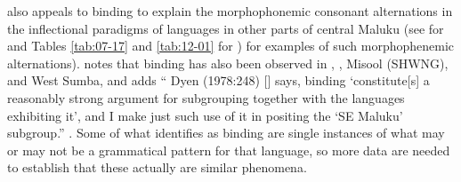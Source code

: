 
\citet[252]{Mills1991} also appeals to binding to explain the
morphophonemic consonant alternations in the inflectional paradigms
of languages in other parts of central Maluku (see 
for  and Tables \ref{tab:07-17} and \ref{tab:12-01} for )
for examples of such morphophenemic alternations).
\citet[252f]{Mills1991} notes that binding has also been observed
in , , Misool (SHWNG), and West Sumba, and adds “ 
Dyen (1978:248) [\citealp{Dyen1978a}]
says, binding ‘constitute[s] a reasonably strong argument for subgrouping
together with the languages exhibiting it’,
and I make just such use of it in positing the ‘SE Maluku’ subgroup.” \citep[253]{Mills1991}.
Some of what \citeauthor{Mills1991} identifies as binding are single instances
of what may or may not be a grammatical pattern for that language,
so more data are needed to establish that these actually are similar phenomena.

